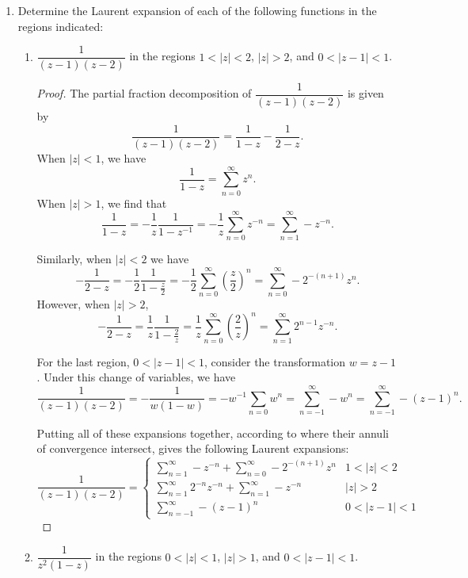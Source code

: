 \documentclass[10pt]{article}
\begin{document}
\begin{enumerate}
\item Determine the Laurent expansion of each of the following functions in the regions indicated:
\begin{enumerate}
\item $\dfrac{1}{(z-1)(z-2)}$ in the regions $1 < |z| < 2$, $|z| > 2$, and $0 < |z-1| < 1$.

\begin{proof}
The partial fraction decomposition of $\dfrac{1}{(z-1)(z-2)}$ is given by
$$
\dfrac{1}{(z-1)(z-2)} = \frac{1}{1-z} - \frac{1}{2-z}.
$$
When $|z| < 1$, we have $$\dfrac{1}{1-z} = \sum_{n=0}^\infty z^n.$$  When $|z| > 1$, we find that
$$
\frac{1}{1-z} = -\frac{1}{z}\frac{1}{1-z^{-1}} = -\frac{1}{z}\sum_{n=0}^\infty z^{-n} = \sum_{n=1}^\infty -z^{-n}.
$$

Similarly, when $|z| < 2$ we have
$$
-\frac{1}{2-z} = -\frac12 \frac{1}{1-\frac{z}{2}} = -\frac{1}{2}\sum_{n=0}^\infty \left(\frac{z}{2} \right)^n = \sum_{n=0}^\infty -2^{-(n+1)}z^n.
$$
However, when $|z| > 2$,
$$
-\frac{1}{2-z} = \frac{1}{z}\frac{1}{1-\frac{2}{z}} = \frac{1}{z}\sum_{n=0}^\infty \left( \frac{2}{z} \right)^n = \sum_{n=1}^\infty 2^{n-1} z^{-n}.
$$

For the last region, $0 < |z-1| < 1$, consider the transformation $w = z-1$.  Under this change of variables, we have
$$
\dfrac{1}{(z-1)(z-2)} = -\dfrac{1}{w(1-w)} = -w^{-1} \sum_{n=0} w^n = \sum_{n=-1}^\infty -w^n = \sum_{n=-1}^\infty -(z-1)^n.
$$

Putting all of these expansions together, according to where their annuli of convergence intersect, gives the following Laurent expansions:
$$
\dfrac{1}{(z-1)(z-2)} = 
\begin{cases}
\sum\limits_{n=1}^\infty -z^{-n} + \sum\limits_{n=0}^\infty -2^{-(n+1)} z^n  & 1 < |z| < 2 \\
\sum\limits_{n=1}^\infty 2^{-n} z^{-n} + \sum\limits_{n=1}^\infty -z^{-n} & |z| > 2 \\
\sum\limits_{n=-1}^\infty -(z-1)^n & 0 < |z-1| < 1
\end{cases}
$$
\end{proof}

\item $\dfrac{1}{z^2(1-z)}$ in the regions $0 < |z| < 1$, $|z| > 1$, and $0 < |z-1| < 1$.


\end{enumerate}
\end{enumerate}
\end{document}
